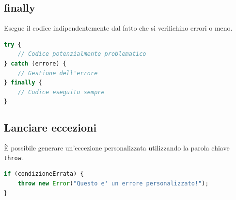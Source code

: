 \subsection{finally}

Esegue il codice indipendentemente dal fatto che si verifichino errori o meno.

\begin{lstlisting}[language=JavaScript]
try {
    // Codice potenzialmente problematico
} catch (errore) {
    // Gestione dell'errore
} finally {
    // Codice eseguito sempre
}
\end{lstlisting}

\subsection{Lanciare eccezioni}

È possibile generare un'eccezione personalizzata utilizzando la parola chiave \texttt{throw}.

\begin{lstlisting}[language=JavaScript]
if (condizioneErrata) {
    throw new Error("Questo e' un errore personalizzato!");
}
\end{lstlisting}
